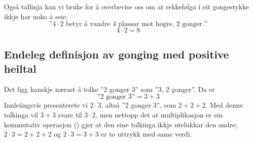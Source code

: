 Også tallinja kan vi bruke for å overbevise oss om at rekkefølga i eit gongestykke ikkje har noko å seie:
\[\text{''} 4\cdot 2 \text{ betyr å vandre 4 plassar mot høgre, 2 gonger.}\text{''} \]
\[ 4\cdot2=8 \]


\subsection*{Endeleg definisjon av gonging med positive heiltal}
Det ligg kanskje nærast å tolke ''2 gonger 3'' som ''3, 2 gonger''. Da er
\[ \text{''2 gonger 3''}=3+3 \]
Innleiingsvis presenterete vi $ {2\cdot3} $, altså ''2 gonger 3'', som $ {2+2+2} $. Med denne tolkinga vil $ {3+3} $ svare til $ {3\cdot2} $, men nettopp det at multiplikasjon er ein kommutativ operasjon () gjer at den eine tolkinga ikkje utelukkar den andre; $ {2\cdot3 =2+2+2} $ og $ {2\cdot3=3+3} $ er to uttrykk med same verdi.\regv




